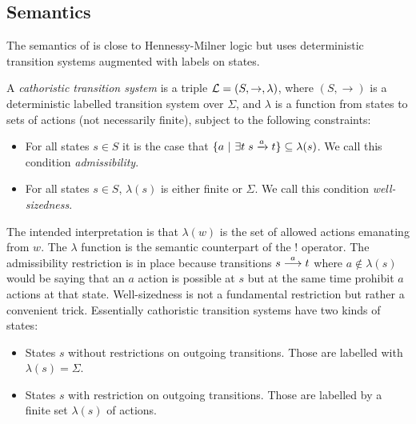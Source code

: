 \subsection{Semantics}

\NI The semantics of \cathoristic{} is close to Hennessy-Milner logic
but uses deterministic transition systems augmented with labels on
states.



\begin{definition}\label{cathoristicTS}
A \emph{cathoristic transition system} is a triple $\mathcal{L} = (S,
\rightarrow, \lambda)$, where $(S, \rightarrow)$ is a deterministic
labelled transition system over $\Sigma$, and $\lambda$ is a function
from states to sets of actions (not necessarily finite), subject to
the following constraints:
\begin{itemize}

\item For all states $s \in S$ it is the case that $ \{a \ | \  \exists
  t \; s \xrightarrow{a} t\} \subseteq \lambda(s)$. We call this
  condition \emph{admissibility}.

\item For all states $s \in S$, $\lambda (s)$ is either finite or
  $\Sigma$. We call this condition \emph{well-sizedness}.

\end{itemize}
\end{definition}

\NI The intended interpretation is that $\lambda(w)$ is the set of
allowed actions emanating from $w$.  The $\lambda$ function
is the semantic counterpart of the $!$ operator.  The admissibility
restriction is in place because transitions $s \stackrel{a}{\longrightarrow} t$ where $a
\notin \lambda(s)$ would be saying that an $a$ action is possible at
$s$ but at the same time prohibit $a$ actions at that state.
Well-sizedness is not a fundamental restriction but rather a
convenient trick. Essentially cathoristic transition systems have two kinds
of states:

\begin{itemize}

\item States $s$ without restrictions on outgoing transitions. Those are
  labelled with $\lambda ( s) = \Sigma$.

\item States $s$ with restriction on outgoing transitions. Those are
  labelled by a finite set $\lambda ( s)$ of actions.

\end{itemize}

